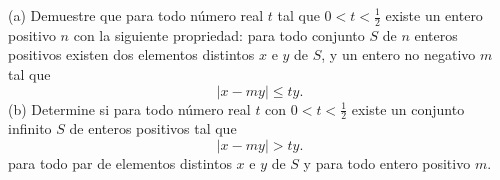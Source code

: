 (a) Demuestre que para todo número real $t$ tal que $0 \lt t \lt \frac12$
 existe un entero positivo $n$ con la
siguiente propriedad: para todo conjunto $S$ de $n$ enteros positivos existen dos elementos distintos
$x$ e $y$ de $S$, y un entero no negativo $m$ tal que
\[\left|x − my\right| \leq ty.\]
(b) Determine si para todo número real $t$ con $0 \lt t \lt \frac12$
 existe un conjunto infinito $S$ de enteros
positivos tal que
\[\left|x − my\right| \gt ty.\]
para todo par de elementos distintos $x$ e $y$ de $S$ y para todo entero positivo $m$.